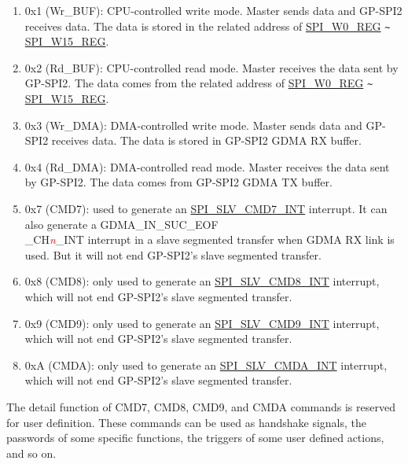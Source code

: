 \documentclass[main\_\_EN.tex]{subfiles}
\begin{document}
\begin{enumerate}
    \item \label{other:spi-item-wrbuf} 0x1 (Wr\_BUF): CPU-controlled write mode. Master sends data and GP-SPI2 receives data. The data is stored in the related address of \hyperref[regdesc:SPIW0REG]{SPI\_W0\_REG} \verb+~+ \hyperref[regdesc:SPIW15REG]{SPI\_W15\_REG}.

    \item \label{other:spi-item-rdbuf} 0x2 (Rd\_BUF): CPU-controlled read mode. Master receives the data sent by GP-SPI2. The data comes from the related address of \hyperref[regdesc:SPIW0REG]{SPI\_W0\_REG} \verb+~+ \hyperref[regdesc:SPIW15REG]{SPI\_W15\_REG}.

    \item \label{other:spi-item-wrdma} 0x3 (Wr\_DMA): DMA-controlled write mode. Master sends data and GP-SPI2 receives data. The data is stored in GP-SPI2 GDMA RX buffer.

    \item 0x4 (Rd\_DMA): DMA-controlled read mode. Master receives the data sent by GP-SPI2. The data comes from GP-SPI2 GDMA TX buffer.

    \item \label{other:spi-item-cmd7} 0x7 (CMD7): used to generate an \hyperref[int:SPISLVCMD7INT]{SPI\_SLV\_CMD7\_INT} interrupt. It can also generate a GDMA\_IN\_SUC\_EOF\\\_CH\textcolor{red}{\it{n}}\_INT interrupt in a slave segmented transfer when GDMA RX link is used. But it will not end GP-SPI2's slave segmented transfer.

    \item 0x8 (CMD8): only used to generate an \hyperref[int:SPISLVCMD8INT]{SPI\_SLV\_CMD8\_INT} interrupt, which will not end GP-SPI2's slave segmented transfer.

    \item 0x9 (CMD9): only used to generate an \hyperref[int:SPISLVCMD9INT]{SPI\_SLV\_CMD9\_INT} interrupt, which will not end GP-SPI2's slave segmented transfer.

    \item 0xA (CMDA): only used to generate an \hyperref[int:SPISLVCMDAINT]{SPI\_SLV\_CMDA\_INT} interrupt, which will not end GP-SPI2's slave segmented transfer.

\end{enumerate}

The detail function of CMD7, CMD8, CMD9, and CMDA commands is reserved for user definition. These commands can be used as handshake signals, the passwords of some specific functions, the triggers of some user defined actions, and so on.
\end{document}
